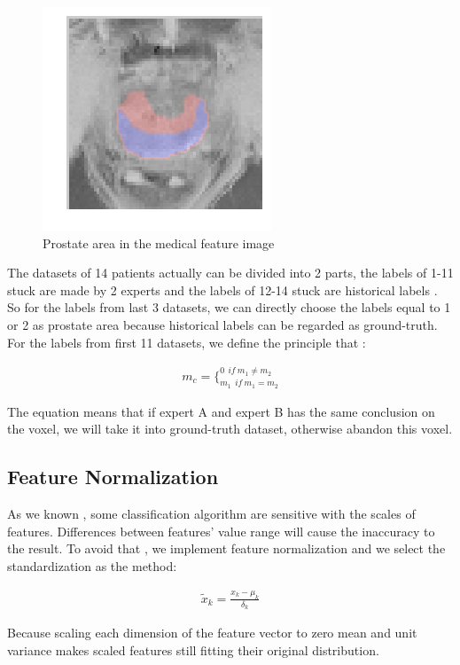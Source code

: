 \documentclass[12pt,DIV14,BCOR12mm,a4paper,footinclude=false,headinclude,parskip=half-,twoside,openright,cleardoublepage=empty,toc=index,bibliography=totoc,listof=totoc]{scrreprt}
\numberwithin{equation}{chapter}
\begin{document}
\begin{figure}
	\centering
	\includegraphics[scale=0.6]{image/prostate}
	\caption{Prostate area in the medical feature image}
	\label{prostate}
\end{figure}

The datasets of 14 patients actually can be divided into 2 parts, the labels of 1-11 stuck are made by 2 experts and the labels of 12-14 stuck are historical labels . So for the labels from last 3 datasets, we can directly choose the labels equal to 1 or 2 as prostate area because historical labels can be regarded as ground-truth. For the labels from first 11 datasets, we define the principle that :

\begin{align}
m_{c}=\lbrace^{0\ \ if\ m_{1} \neq m_{2}}_{m_{1}\ \ if\ m_{1}=m_{2}}
\end{align}
 
The equation means that if expert A and expert B has the same conclusion on the voxel, we will take it into ground-truth dataset, otherwise abandon this voxel.

\subsection{Feature Normalization}
As we known , some classification algorithm are sensitive with the scales of features. Differences between features' value range will cause the inaccuracy to the result. To avoid that , we implement feature normalization and we select the standardization as the method:

\begin{align}
\tilde{x}_{k}=\frac{x_{k}-\mu_{k}}{\delta_{k}}
\end{align}

Because scaling each dimension of the feature vector to zero mean and unit variance makes scaled features still fitting their original distribution.
\end{document}
